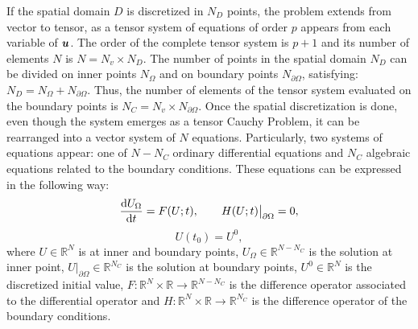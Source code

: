        
If the spatial domain $D$ is discretized in $N_D$ points, the problem extends from vector to tensor, as a tensor system of equations of order $p$ appears from each variable of $\boldsymbol{u}$. The order of the complete tensor system is $p +1$ and its number of elements $N$ is $N= {N_v} \times N_D$. The number of points in the spatial domain $N_D$ can be divided on inner points $N_{\Omega}$ and on boundary points $N_{\partial\Omega}$, satisfying: $N_D = N_{\Omega} + N_{\partial\Omega} $. Thus, the number of elements of the tensor system evaluated on the boundary points is $N_C= {N_v} \times N_{\partial\Omega}$. Once the spatial discretization is done, even though the system emerges as a tensor Cauchy Problem, it can be rearranged into a vector system of $N$ equations. 
Particularly,  two systems of equations appear: one of $N-N_C$ ordinary differential equations and $N_C$ algebraic equations related to the boundary conditions. These equations can be expressed in the following way:  
       $$\dv{{U}_{\Omega}}{t} = {F}({U};t) , \qquad {H}({U};t)\big\rvert_{\partial \Omega}=0, $$ 
       $$ {U}(t_0)={U}^0,$$
where $U \in \mathbb{ R}^{N}$ is at inner and boundary points, $U_{\Omega}\in \mathbb{ R}^{N-N_C}$ is the solution at inner point, $U \big\rvert_{\partial \Omega} \in \mathbb{ R}^{N_C}$ is the solution at boundary points, $U^0 \in \mathbb{ R}^{N}$ is the discretized initial value, ${F}: \mathbb{ R}^{N} \times \mathbb{ R}\rightarrow \mathbb{R}^{N-N_C} $ is the difference operator associated to the differential operator and ${H}: \mathbb{ R}^{N} \times \mathbb{ R}\rightarrow \mathbb{R}^{N_C}$ is the difference operator of the boundary conditions. 
       
